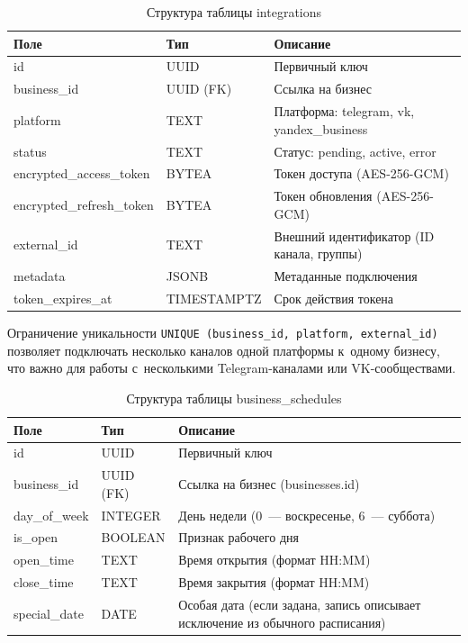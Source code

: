 \begin{table}[H]
  \caption{Структура таблицы integrations}
  \label{tab:integrations}
  \small
  \begin{tabularx}{\textwidth}{|p{4cm}|p{3cm}|X|}
    \hline
    \textbf{Поле} & \textbf{Тип} & \textbf{Описание} \\
    \hline
    id & UUID & Первичный ключ \\
    \hline
    business\_id & UUID (FK) & Ссылка на бизнес \\
    \hline
    platform & TEXT & Платформа: telegram, vk, yandex\_business \\
    \hline
    status & TEXT & Статус: pending, active, error \\
    \hline
    encrypted\_access\_token & BYTEA & Токен доступа (AES-256-GCM) \\
    \hline
    encrypted\_refresh\_token & BYTEA & Токен обновления (AES-256-GCM) \\
    \hline
    external\_id & TEXT & Внешний идентификатор (ID канала, группы) \\
    \hline
    metadata & JSONB & Метаданные подключения \\
    \hline
    token\_expires\_at & TIMESTAMPTZ & Срок действия токена \\
    \hline
  \end{tabularx}
\end{table}

Ограничение уникальности \texttt{UNIQUE (business\_id, platform, external\_id)} позволяет подключать несколько каналов одной платформы к~одному бизнесу, что важно для работы с~несколькими Telegram-каналами или VK-сообществами.

\begin{table}[H]
  \caption{Структура таблицы business\_schedules}
  \label{tab:schedules}
  \small
  \begin{tabularx}{\textwidth}{|p{3cm}|p{3cm}|X|}
    \hline
    \textbf{Поле} & \textbf{Тип} & \textbf{Описание} \\
    \hline
    id & UUID & Первичный ключ \\
    \hline
    business\_id & UUID (FK) & Ссылка на бизнес (businesses.id) \\
    \hline
    day\_of\_week & INTEGER & День недели (0~--- воскресенье, 6~--- суббота) \\
    \hline
    is\_open & BOOLEAN & Признак рабочего дня \\
    \hline
    open\_time & TEXT & Время открытия (формат HH:MM) \\
    \hline
    close\_time & TEXT & Время закрытия (формат HH:MM) \\
    \hline
    special\_date & DATE & Особая дата (если задана, запись описывает исключение из обычного расписания) \\
    \hline
  \end{tabularx}
\end{table}

